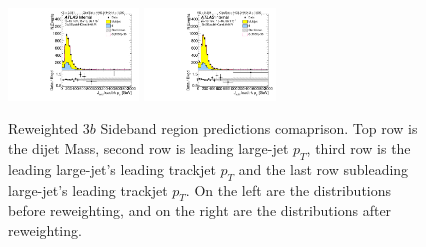 \begin{figure}[htbp!]
\begin{center}
\includegraphics[width=0.31\textwidth,angle=-90]{figures/boosted/Prereweight/Moriond_ThreeTag_Sideband_sublHCand_trk0_Pt.pdf}
\includegraphics[width=0.31\textwidth,angle=-90]{figures/boosted/Sideband/b77_ThreeTag_Sideband_sublHCand_trk0_Pt.pdf}\\
\caption{Reweighted $3b$ Sideband region predictions comaprison. Top row is the dijet Mass, second row is leading large-\R jet $p_{T}$, third row is the leading large-\R jet's leading trackjet $p_T$ and the last row subleading large-\R jet's leading trackjet $p_T$. On the left are the distributions before reweighting, and on the right are the distributions after reweighting.}
\label{fig:rw-3b-comp-sb}
\end{center}
\end{figure}


